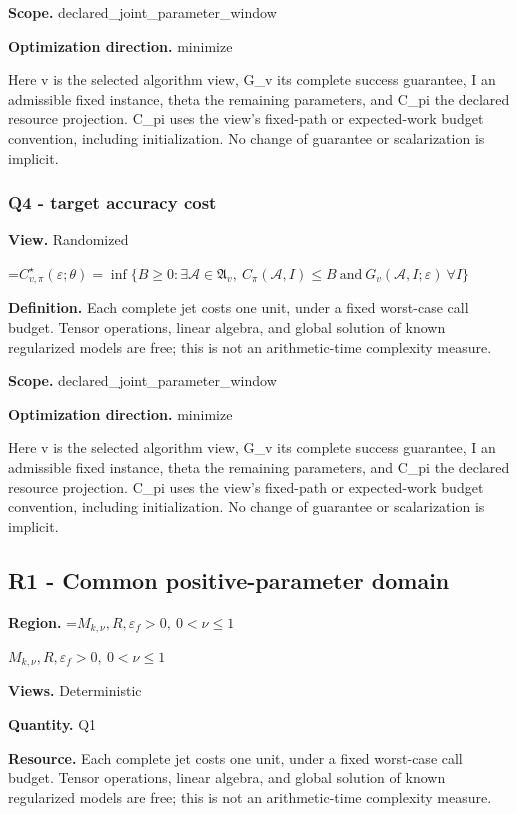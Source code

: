 \documentclass[10pt,a4paper]{article}
\newcommand{\AtlasMath}[1]{\par\begingroup\centering\setbox0=\hbox{$\displaystyle #1$}\ifdim\wd0>1.4\linewidth\typeout{ATLAS WIDE FORMULA: \the\wd0}\fi\ifdim\wd0>\linewidth\resizebox{\linewidth}{!}{\box0}\else\box0\fi\par\endgroup}
\newcommand{\AtlasInlineMath}[1]{\begingroup\setbox0=\hbox{$#1$}\ifdim\wd0>.4\linewidth\endgroup\AtlasMath{#1}\else\endgroup$#1$\fi}
\begin{document}
\textbf{Scope.} declared\_joint\_parameter\_window

\textbf{Optimization direction.} minimize

Here v is the selected algorithm view, G\_v its complete success guarantee, I an admissible fixed instance, theta the remaining parameters, and C\_pi the declared resource projection. C\_pi uses the view's fixed-path or expected-work budget convention, including initialization. No change of guarantee or scalarization is implicit.

\subsubsection{Q4 - target accuracy cost}
\textbf{View.} Randomized

\AtlasMath{C^\star_{v,\pi}(\varepsilon;\theta)=\inf\{B\ge0:\exists\mathcal A\in\mathfrak A_v,\ C_\pi(\mathcal A,I)\le B\ \text{and}\ G_v(\mathcal A,I;\varepsilon)\ \forall I\}}
\textbf{Definition.} Each complete jet costs one unit, under a fixed worst-case call budget. Tensor operations, linear algebra, and global solution of known regularized models are free; this is not an arithmetic-time complexity measure.

\textbf{Scope.} declared\_joint\_parameter\_window

\textbf{Optimization direction.} minimize

Here v is the selected algorithm view, G\_v its complete success guarantee, I an admissible fixed instance, theta the remaining parameters, and C\_pi the declared resource projection. C\_pi uses the view's fixed-path or expected-work budget convention, including initialization. No change of guarantee or scalarization is implicit.

\subsection{R1 - Common positive-parameter domain}
\textbf{Region.} \AtlasInlineMath{M_{k,\nu},R,\varepsilon_f>0,\ 0<\nu\le1}

\textbf{Views.} Deterministic

\textbf{Quantity.} Q1

\textbf{Resource.} Each complete jet costs one unit, under a fixed worst-case call budget. Tensor operations, linear algebra, and global solution of known regularized models are free; this is not an arithmetic-time complexity measure.
\end{document}
